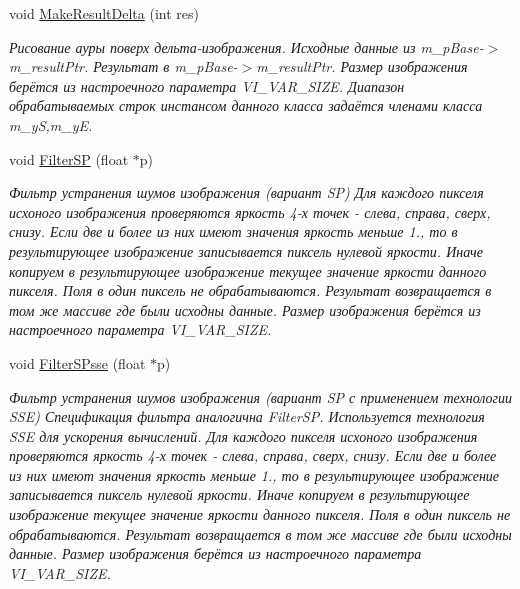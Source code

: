 \begin{DoxyCompactItemize}
void \hyperlink{class_c_v_i_engine_thread_ab6c4ea18d353a7dc00aa1698c379afde}{Make\+Result\+Delta} (int res)
\begin{DoxyCompactList}\small\item\em Рисование ауры поверх дельта-\/изображения. Исходные данные из m\+\_\+p\+Base-\/$>$m\+\_\+result\+Ptr. Результат в m\+\_\+p\+Base-\/$>$m\+\_\+result\+Ptr. Размер изображения берётся из настроечного параметра V\+I\+\_\+\+V\+A\+R\+\_\+\+S\+I\+Z\+E. Диапазон обрабатываемых строк инстансом данного класса задаётся членами класса m\+\_\+y\+S,m\+\_\+y\+E. \end{DoxyCompactList}\item 
void \hyperlink{class_c_v_i_engine_thread_a7e13a627c4b748b2a897e5cfb314f0a2}{Filter\+S\+P} (float $\ast$p)
\begin{DoxyCompactList}\small\item\em Фильтр устранения шумов изображения (вариант S\+P) Для каждого пикселя исхоного изображения проверяются яркость 4-\/х точек -\/ слева, справа, сверх, снизу. Если две и более из них имеют значения яркость меньше 1., то в результирующее изображение записывается пиксель нулевой яркости. Иначе копируем в результирующее изображение текущее значение яркости данного пикселя. Поля в один пиксель не обрабатываются. Результат возвращается в том же массиве где были исходны данные. Размер изображения берётся из настроечного параметра V\+I\+\_\+\+V\+A\+R\+\_\+\+S\+I\+Z\+E. \end{DoxyCompactList}\item 
void \hyperlink{class_c_v_i_engine_thread_a900848dc88ad3445296cbd72c467875c}{Filter\+S\+Psse} (float $\ast$p)
\begin{DoxyCompactList}\small\item\em Фильтр устранения шумов изображения (вариант S\+P с применением технологии S\+S\+E) Спецификация фильтра аналогична Filter\+S\+P. Используется технология S\+S\+E для ускорения вычислений. Для каждого пикселя исхоного изображения проверяются яркость 4-\/х точек -\/ слева, справа, сверх, снизу. Если две и более из них имеют значения яркость меньше 1., то в результирующее изображение записывается пиксель нулевой яркости. Иначе копируем в результирующее изображение текущее значение яркости данного пикселя. Поля в один пиксель не обрабатываются. Результат возвращается в том же массиве где были исходны данные. Размер изображения берётся из настроечного параметра V\+I\+\_\+\+V\+A\+R\+\_\+\+S\+I\+Z\+E. \end{DoxyCompactList}\item 

\end{DoxyCompactItemize}
